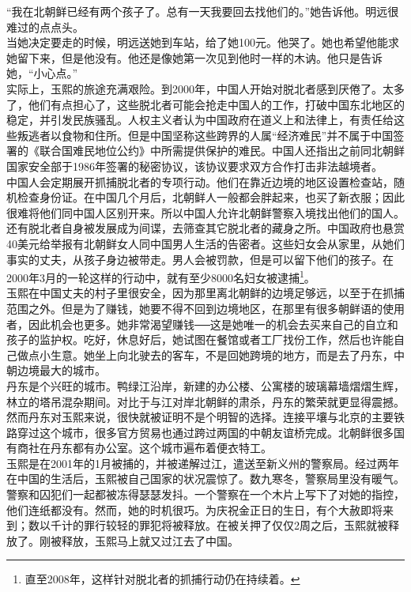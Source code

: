 “我在北朝鲜已经有两个孩子了。总有一天我要回去找他们的。”她告诉他。明远很难过的点点头。\\

当她决定要走的时候，明远送她到车站，给了她100元。他哭了。她也希望他能求她留下来，但是他没有。他还是像她第一次见到他时一样的木讷。他只是告诉她，“小心点。”\\

实际上，玉熙的旅途充满艰险。到2000年，中国人开始对脱北者感到厌倦了。太多了，他们有点担心了，这些脱北者可能会抢走中国人的工作，打破中国东北地区的稳定，并引发民族骚乱。人权主义者认为中国政府在道义上和法律上，有责任给这些叛逃者以食物和住所。但是中国坚称这些跨界的人属“经济难民”并不属于中国签署的《联合国难民地位公约》中所需提供保护的难民。中国人还指出之前同北朝鲜国家安全部于1986年签署的秘密协议，该协议要求双方合作打击非法越境者。\\

中国人会定期展开抓捕脱北者的专项行动。他们在靠近边境的地区设置检查站，随机检查身份证。在中国几个月后，北朝鲜人一般都会胖起来，也买了新衣服；因此很难将他们同中国人区别开来。所以中国人允许北朝鲜警察入境找出他们的国人。还有脱北者自身被发展成为间谍，去筛查其它脱北者的藏身之所。中国政府也悬赏40美元给举报有北朝鲜女人同中国男人生活的告密者。这些妇女会从家里，从她们事实的丈夫，从孩子身边被带走。男人会被罚款，但是可以留下他们的孩子。在2000年3月的一轮这样的行动中，就有至少8000名妇女被逮捕\footnote{直至2008年，这样针对脱北者的抓捕行动仍在持续着。}。\\

玉熙在中国丈夫的村子里很安全，因为那里离北朝鲜的边境足够远，以至于在抓捕范围之外。但是为了赚钱，她要不得不回到边境地区，在那里有很多朝鲜语的使用者，因此机会也更多。她非常渴望赚钱──这是她唯一的机会去买来自己的自立和孩子的监护权。吃好，休息好后，她试图在餐馆或者工厂找份工作，然后也许能自己做点小生意。她坐上向北驶去的客车，不是回她跨境的地方，而是去了丹东，中朝边境最大的城市。\\

丹东是个兴旺的城市。鸭绿江沿岸，新建的办公楼、公寓楼的玻璃幕墙熠熠生辉，林立的塔吊混杂期间。对比于与江对岸北朝鲜的肃杀，丹东的繁荣就更显得震撼。然而丹东对玉熙来说，很快就被证明不是个明智的选择。连接平壤与北京的主要铁路穿过这个城市，很多官方贸易也通过跨过两国的中朝友谊桥完成。北朝鲜很多国有商社在丹东都有办公室。这个城市遍布着便衣特工。\\

玉熙是在2001年的1月被捕的，并被递解过江，遣送至新义州的警察局。经过两年在中国的生活后，玉熙被自己国家的状况震惊了。数九寒冬，警察局里没有暖气。警察和囚犯们一起都被冻得瑟瑟发抖。一个警察在一个木片上写下了对她的指控，他们连纸都没有。然而，她的时机很巧。为庆祝金正日的生日，有个大赦即将来到；数以千计的罪行较轻的罪犯将被释放。在被关押了仅仅2周之后，玉熙就被释放了。刚被释放，玉熙马上就又过江去了中国。\\

